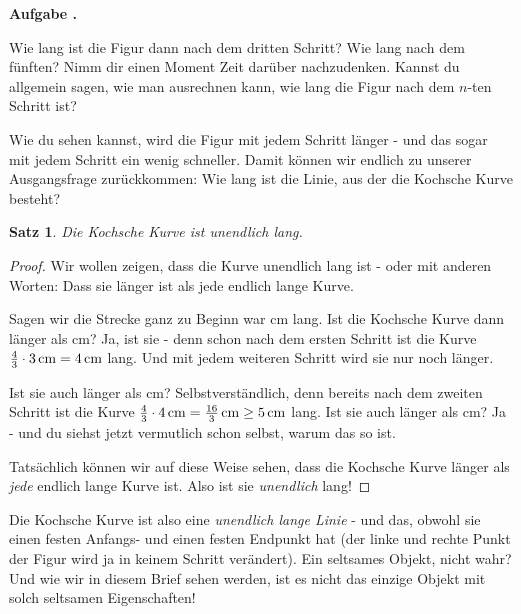 \documentclass[a4paper,ngerman,12pt]{scrartcl}
\theoremstyle{definition}
\theoremstyle{plain}
\newtheorem{satz}[defn]{Satz}
\theoremstyle{remark}
\newlength{\aufgabenskip}
\newcounter{aufgabennummer}
\newenvironment{aufgabe}[1]{
  \addtocounter{aufgabennummer}{1}
  \textbf{Aufgabe \theaufgabennummer.} \emph{#1} \par
}{\vspace{\aufgabenskip}}
\begin{document}
\begin{aufgabe}{}
	Wie lang ist die Figur dann nach dem dritten Schritt? Wie lang nach dem fünften? Nimm dir einen Moment Zeit darüber nachzudenken. Kannst du allgemein sagen, wie man ausrechnen kann, wie lang die Figur nach dem $n$-ten Schritt ist? 
\end{aufgabe}

Wie du sehen kannst, wird die Figur mit jedem Schritt länger - und das sogar mit jedem Schritt ein wenig schneller. Damit können wir endlich zu unserer Ausgangsfrage zurückkommen: Wie lang ist die Linie, aus der die Kochsche Kurve besteht?

\begin{satz}\label{satz:Kochkurve_laenge}
Die Kochsche Kurve ist unendlich lang.
\end{satz} 

\begin{proof}
Wir wollen zeigen, dass die Kurve unendlich lang ist - oder mit anderen Worten: Dass sie länger ist als jede endlich lange Kurve.

Sagen wir die Strecke ganz zu Beginn war \unit[3]{cm} lang. Ist die Kochsche Kurve dann länger als \unit[4]{cm}? Ja, ist sie - denn schon nach dem ersten Schritt ist die Kurve $\frac{4}{3}\cdot\unit[3]{cm} = \unit[4]{cm}$ lang. Und mit jedem weiteren Schritt wird sie nur noch länger. 

Ist sie auch länger als \unit[5]{cm}? Selbstverständlich, denn bereits nach dem zweiten Schritt ist die Kurve $\frac{4}{3}\cdot\unit[4]{cm} = \unit[\frac{16}{3}]{cm}\geq  \unit[5]{cm}$ lang. Ist sie auch länger als \unit[6]{cm}? Ja - und du siehst jetzt vermutlich schon selbst, warum das so ist. 

Tatsächlich können wir auf diese Weise sehen, dass die Kochsche Kurve länger als \emph{jede} endlich lange Kurve ist. Also ist sie \emph{unendlich} lang!
\end{proof}

Die Kochsche Kurve ist also eine \emph{unendlich lange Linie} - und das, obwohl sie einen festen Anfangs- und einen festen Endpunkt hat (der linke und rechte Punkt der Figur wird ja in keinem Schritt verändert). Ein seltsames Objekt, nicht wahr? Und wie wir in diesem Brief sehen werden, ist es nicht das einzige Objekt mit solch seltsamen Eigenschaften!
\end{document}
